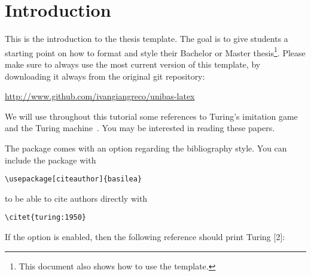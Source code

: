 \chapter{Introduction}

This is the introduction to the thesis template. The goal is to give students a starting point on how to format and style their Bachelor or Master thesis\footnote{This document also shows how to use the template.}. 
\vspace{2cm}
Please make sure to always use the most current version of this template, by downloading it always from the original git repository:
\begin{center}
	\url{http://www.github.com/ivangiangreco/unibas-latex} 
\end{center}

We will use throughout this tutorial some references to Turing's imitation game~\cite{turing:1950} and the Turing machine~\cite{turing:1936}. You may be interested in reading these papers.

\vspace{1em}
The package comes with an option regarding the bibliography style.
You can include the package with
\begin{verbatim}
\usepackage[citeauthor]{basilea}
\end{verbatim}
to be able to cite authors directly with
\begin{verbatim}
\citet{turing:1950}
\end{verbatim}

If the option is enabled, then the following reference should print Turing [2]:~\citet{turing:1950}

